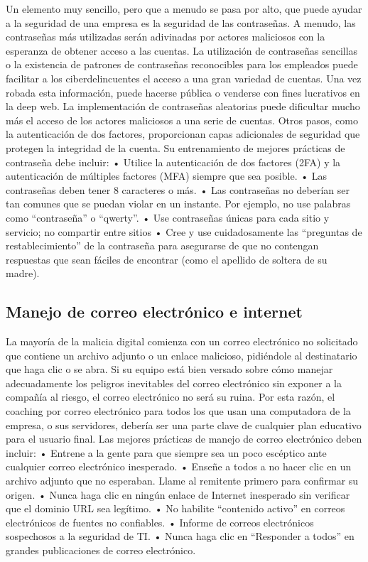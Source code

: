 \documentclass[
]{article}
\begin{document}
Un elemento muy sencillo, pero que a menudo se pasa por alto, que puede ayudar a la seguridad de una empresa es la seguridad de las contraseñas. A menudo, las contraseñas más utilizadas serán adivinadas por actores maliciosos con la esperanza de obtener acceso a las cuentas. La utilización de contraseñas sencillas o la existencia de patrones de contraseñas reconocibles para los empleados puede facilitar a los ciberdelincuentes el acceso a una gran variedad de cuentas. Una vez robada esta información, puede hacerse pública o venderse con fines lucrativos en la deep web.
La implementación de contraseñas aleatorias puede dificultar mucho más el acceso de los actores maliciosos a una serie de cuentas. Otros pasos, como la autenticación de dos factores, proporcionan capas adicionales de seguridad que protegen la integridad de la cuenta.
Su entrenamiento de mejores prácticas de contraseña debe incluir:
• Utilice la autenticación de dos factores (2FA) y la autenticación de múltiples factores (MFA) siempre que sea posible.
• Las contraseñas deben tener 8 caracteres o más.
• Las contraseñas no deberían ser tan comunes que se puedan violar en un instante. Por ejemplo, no use palabras como ``contraseña'' o ``qwerty''.
• Use contraseñas únicas para cada sitio y servicio; no compartir entre sitios
• Cree y use cuidadosamente las ``preguntas de restablecimiento'' de la contraseña para asegurarse de que no contengan respuestas que sean fáciles de encontrar (como el apellido de soltera de su madre).

\hypertarget{manejo-de-correo-electruxf3nico-e-internet}{%
\subsection{Manejo de correo electrónico e internet}\label{manejo-de-correo-electruxf3nico-e-internet}}

La mayoría de la malicia digital comienza con un correo electrónico no solicitado que contiene un archivo adjunto o un enlace malicioso, pidiéndole al destinatario que haga clic o se abra. Si su equipo está bien versado sobre cómo manejar adecuadamente los peligros inevitables del correo electrónico sin exponer a la compañía al riesgo, el correo electrónico no será su ruina. Por esta razón, el coaching por correo electrónico para todos los que usan una computadora de la empresa, o sus servidores, debería ser una parte clave de cualquier plan educativo para el usuario final.
Las mejores prácticas de manejo de correo electrónico deben incluir:
• Entrene a la gente para que siempre sea un poco escéptico ante cualquier correo electrónico inesperado.
• Enseñe a todos a no hacer clic en un archivo adjunto que no esperaban. Llame al remitente primero para confirmar su origen.
• Nunca haga clic en ningún enlace de Internet inesperado sin verificar que el dominio URL sea legítimo.
• No habilite ``contenido activo'' en correos electrónicos de fuentes no confiables.
• Informe de correos electrónicos sospechosos a la seguridad de TI.
• Nunca haga clic en ``Responder a todos'' en grandes publicaciones de correo electrónico.
\end{document}
